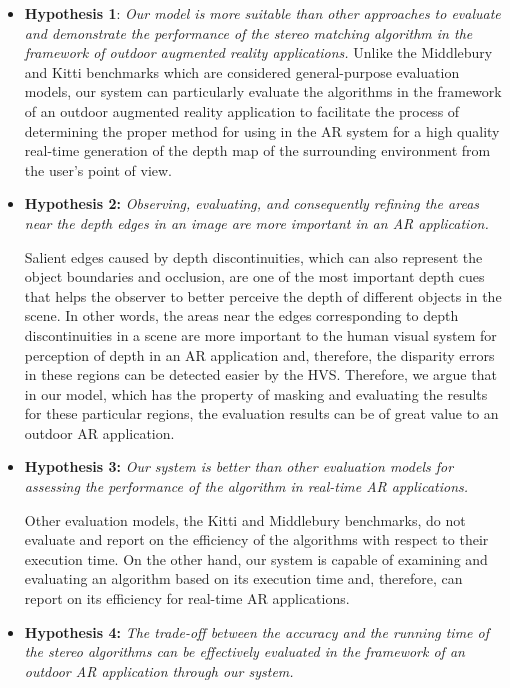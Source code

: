 \begin{itemize}
\item \textbf{Hypothesis 1}: \emph{Our model is more suitable than other approaches to evaluate and demonstrate
the performance of the stereo matching algorithm in the framework of 
outdoor augmented reality applications.} 
Unlike the Middlebury and Kitti benchmarks which are considered general-purpose evaluation models, 
our system can particularly evaluate the algorithms in the framework of an 
outdoor augmented reality application to facilitate the process of determining
the proper method for using in the AR system for a high quality real-time generation of the depth map of the surrounding environment from 
the user's point of view.

\item \textbf{Hypothesis 2:} \emph{Observing, evaluating, and consequently 
refining the areas near the depth edges in an image are more important in an AR application.}

Salient edges caused by depth discontinuities, 
which can also represent the object boundaries and occlusion, are one of the 
most important depth cues that helps the observer to better perceive the depth of different objects in the scene. In other words, the areas near the edges corresponding to depth discontinuities
in a scene are more important to the human visual system for perception of depth in an AR application and, therefore, the disparity 
errors in these regions can be detected easier by the HVS. Therefore, we argue that in our model, which has the property of masking and evaluating the results for
these particular regions,
the evaluation results can be of great value to an outdoor AR application.

\item \textbf{Hypothesis 3:} \emph{Our system is better than other evaluation models for assessing the performance of the algorithm in
real-time AR applications.}

Other evaluation models, the Kitti and Middlebury benchmarks, do not evaluate and report on the efficiency of the algorithms
with respect to their execution time. On the other hand, our system is capable of examining and evaluating an algorithm 
based on its execution time and, therefore, can report on its efficiency for real-time AR applications.

\item \textbf{Hypothesis 4:} \emph{The trade-off between the accuracy and the running time of the stereo algorithms can be effectively evaluated 
in the framework of an outdoor AR application through our system.} 


\end{itemize}

